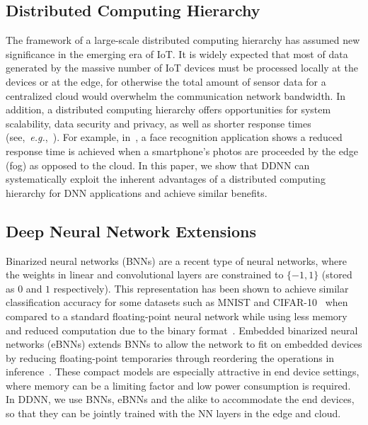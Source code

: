 \documentclass[10pt, conference, compsocconf]{IEEEtran}
\newcommand{\eg}{\emph{e.g.}}
\begin{document}
\subsection{Distributed Computing Hierarchy}
The framework of a large-scale distributed computing hierarchy has assumed new significance in the emerging era of IoT. It is widely expected that most of data generated by the massive number of IoT devices must be processed locally at the devices or at the edge, for otherwise the total amount of sensor data for a centralized cloud would overwhelm the communication network bandwidth. In addition, a distributed computing hierarchy offers opportunities for system scalability, data security and privacy, as well as shorter response times (see,~\eg,~\cite{skala2015scalable, yi2015fog}). For example, in~\cite{yi2015fog}, a face recognition application shows a reduced response time is achieved when a smartphone's photos are proceeded by the edge (fog) as opposed to the cloud. In this paper, we show that DDNN can systematically exploit the inherent advantages of a distributed computing hierarchy for DNN applications and achieve similar benefits.

\subsection{Deep Neural Network Extensions}
Binarized neural networks (BNNs) are a recent type of neural networks, where the weights in linear and convolutional layers are constrained to $\{-1, 1\}$ (stored as $0$ and $1$ respectively). This representation has been shown to achieve similar classification accuracy for some datasets such as MNIST and CIFAR-10~\cite{rastegari2016xnor} when compared to a standard floating-point neural network while using less memory and reduced computation due to the binary format~\cite{courbariaux2015binaryconnect}. Embedded binarized neural networks (eBNNs) extends BNNs to allow the network to fit on embedded devices by reducing floating-point temporaries through reordering the operations in inference~\cite{mcdanel2016ebnn}. These compact models are especially attractive in end device settings, where memory can be a limiting factor and low power consumption is required. In DDNN, we use BNNs, eBNNs and the alike to accommodate the end devices, so that they can be jointly trained with the NN layers in the edge and cloud.
\end{document}
